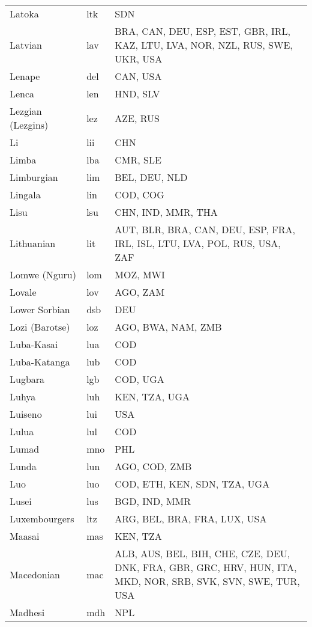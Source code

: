\documentclass[12pt]{article}
\begin{document}
\begin{center}
\begin{longtable}{|p{7cm}|p{1cm}|p{7cm}|}
Latoka	&	ltk	&	SDN	\\	\cline{1-3}
Latvian	&	lav 	&	BRA, CAN, DEU, ESP, EST, GBR, IRL, KAZ, LTU, LVA, NOR, NZL, RUS, SWE, UKR, USA	\\	\cline{1-3}
Lenape	&	del 	&	CAN, USA	\\	\cline{1-3}
Lenca	&	len	&	HND, SLV	\\	\cline{1-3}
Lezgian (Lezgins)	&	lez 	&	AZE, RUS	\\	\cline{1-3}
Li	&	lii	&	CHN	\\	\cline{1-3}
Limba	&	lba	&	CMR, SLE	\\	\cline{1-3}
Limburgian	&	lim 	&	BEL, DEU, NLD	\\	\cline{1-3}
Lingala	&	lin 	&	COD, COG	\\	\cline{1-3}
Lisu	&	lsu	&	CHN, IND, MMR, THA	\\	\cline{1-3}
Lithuanian	&	lit 	&	AUT, BLR, BRA, CAN, DEU, ESP, FRA, IRL, ISL, LTU, LVA, POL, RUS, USA, ZAF	\\	\cline{1-3}
Lomwe (Nguru)	&	lom	&	MOZ, MWI	\\	\cline{1-3}
Lovale	&	lov	&	AGO, ZAM	\\	\cline{1-3}
Lower Sorbian	&	dsb 	&	DEU	\\	\cline{1-3}
Lozi (Barotse)	&	loz 	&	AGO, BWA, NAM, ZMB	\\	\cline{1-3}
Luba-Kasai	&	lua 	&	COD	\\	\cline{1-3}
Luba-Katanga	&	lub 	&	COD	\\	\cline{1-3}
Lugbara	&	lgb	&	COD, UGA	\\	\cline{1-3}
Luhya	&	luh	&	KEN, TZA, UGA	\\	\cline{1-3}
Luiseno	&	lui 	&	USA	\\	\cline{1-3}
Lulua	&	lul	&	COD	\\	\cline{1-3}
Lumad	&	mno 	&	PHL	\\	\cline{1-3}
Lunda	&	lun 	&	AGO, COD, ZMB	\\	\cline{1-3}
Luo	&	luo 	&	COD, ETH, KEN, SDN, TZA, UGA 	\\	\cline{1-3}
Lusei	&	lus 	&	BGD, IND, MMR	\\	\cline{1-3}
Luxembourgers	&	ltz 	&	ARG, BEL, BRA, FRA, LUX, USA	\\	\cline{1-3}
Maasai	&	mas 	&	KEN, TZA	\\	\cline{1-3}
Macedonian	&	mac 	&	ALB, AUS, BEL, BIH, CHE, CZE, DEU, DNK, FRA, GBR, GRC, HRV, HUN, ITA, MKD, NOR, SRB, SVK, SVN, SWE, TUR, USA	\\	\cline{1-3}
Madhesi	&	mdh	&	NPL	\\	\cline{1-3}

\end{longtable}
\end{center}
\end{document}
